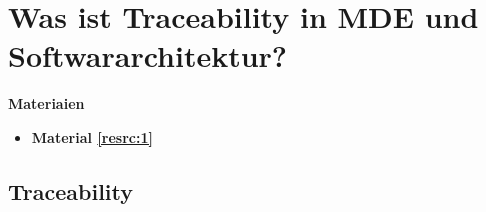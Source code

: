 \section{Was ist Traceability in MDE und Softwararchitektur?}

\textbf{Materiaien}
\begin{itemize}

\item
\textbf{Material \ref{resrc:1}}

\end{itemize}


\subsection{Traceability}
